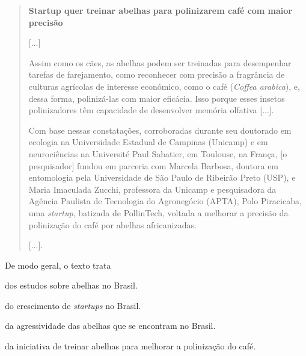 \begin{quote}
\textbf{Startup quer treinar abelhas para polinizarem café com maior precisão}

{[}...{]}

Assim como os cães, as abelhas podem ser treinadas para desempenhar
tarefas de farejamento, como reconhecer com precisão a fragrância de
culturas agrícolas de interesse econômico, como o café (\textit{Coffea arabica}),
e, dessa forma, polinizá-las com maior eficácia. Isso porque esses
insetos polinizadores têm capacidade de desenvolver memória olfativa
{[}...{]}.

Com base nessas constatações, corroboradas durante seu doutorado em
ecologia na Universidade Estadual de Campinas (Unicamp) e em
neurociências na Université Paul Sabatier, em Toulouse, na França,
[o pesquisador] fundou em parceria com Marcela Barbosa, doutora em entomologia
pela Universidade de São Paulo de Ribeirão Preto (USP), e Maria
Imaculada Zucchi, professora da Unicamp e pesquisadora da Agência
Paulista de Tecnologia do Agronegócio (APTA), Polo Piracicaba, uma
\textit{startup}, batizada de PollinTech, voltada a melhorar a precisão da
polinização do café por abelhas africanizadas.

{[}...{]}.

\end{quote}

De modo geral, o texto trata

\begin{escolha}
\item dos estudos sobre abelhas no Brasil.

\item do crescimento de \textit{startups} no Brasil.

\item da agressividade das abelhas que se encontram no Brasil.

\item da iniciativa de treinar abelhas para melhorar a polinização do café.
\end{escolha}


